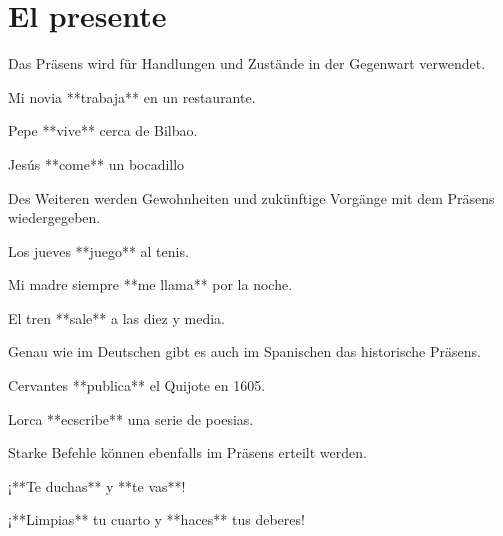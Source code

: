 \section*{El presente}

\begin{highlight}
Das Präsens wird für Handlungen und Zustände in der Gegenwart verwendet.
\end{highlight}

\begin{compactitem}
    \item Mi novia **trabaja** en un restaurante.
    \item Pepe **vive** cerca de Bilbao.
    \item Jesús **come** un  bocadillo
\end{compactitem}

\begin{highlight}
Des Weiteren werden Gewohnheiten und zukünftige Vorgänge mit dem Präsens wiedergegeben.
\end{highlight}

\begin{compactitem}
    \item Los jueves **juego** al tenis.
    \item Mi madre siempre **me llama** por la noche.
    \item El tren **sale** a las diez y media.
\end{compactitem}

Genau wie im Deutschen gibt es auch im Spanischen das historische Präsens.

\begin{compactitem}
    \item Cervantes **publica** el Quijote en 1605.
    \item Lorca **ecscribe** una serie de poesias.
\end{compactitem}

\begin{highlight}
Starke Befehle können ebenfalls im Präsens erteilt werden.
\end{highlight}

\begin{compactitem}
    \item ¡**Te duchas** y **te vas**!
    \item ¡**Limpias** tu cuarto y **haces** tus deberes!
\end{compactitem}